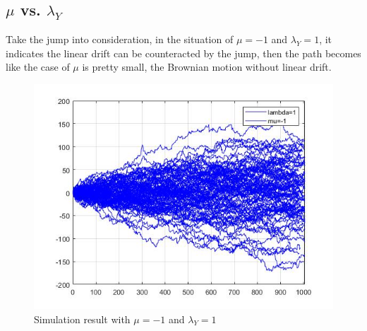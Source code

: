 \subsection{$\mu$ vs. $\lambda_Y$} \label{4.4}
Take the jump into consideration, in the situation of $\mu=-1$ and $\lambda_Y=1$, it indicates the linear drift can be counteracted by the jump, then the path becomes like the case of $\mu$ is pretty small, the Brownian motion without linear drift. 
\begin{figure}[H]
    \centering
    \includegraphics[scale=0.6]{figures/Task3/lambda=1mu=-1.jpg}
    \caption{Simulation result with $\mu=-1$ and $\lambda_Y=1$}
    \label{fig:my_label}
\end{figure}










\newpage